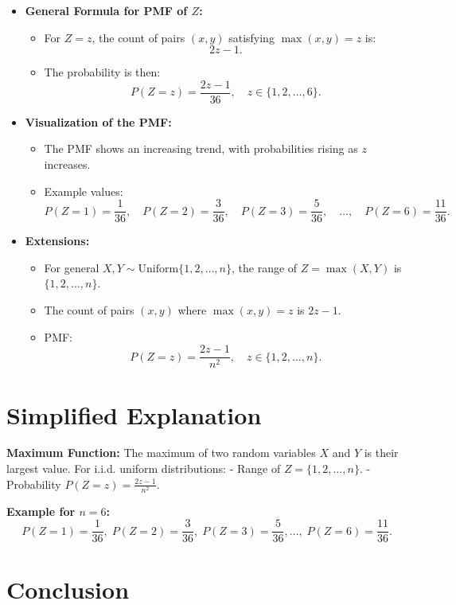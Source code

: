 \documentclass{article}
\begin{document}
\begin{itemize}
  \item \textbf{General Formula for PMF of $Z$:}
    \begin{itemize}
      \item For $Z = z$, the count of pairs $(x, y)$ satisfying $\max(x, y) = z$ is:
        \[
          2z - 1.
        \]
      \item The probability is then:
        \[
          P(Z = z) = \frac{2z - 1}{36}, \quad z \in \{1, 2, \dots, 6\}.
        \]
    \end{itemize}

  \item \textbf{Visualization of the PMF:}
    \begin{itemize}
      \item The PMF shows an increasing trend, with probabilities rising as $z$ increases.
      \item Example values:
        \[
          P(Z = 1) = \frac{1}{36}, \quad P(Z = 2) = \frac{3}{36}, \quad P(Z = 3) = \frac{5}{36}, \quad \dots, \quad P(Z = 6) = \frac{11}{36}.
        \]
    \end{itemize}

  \item \textbf{Extensions:}
    \begin{itemize}
      \item For general $X, Y \sim \text{Uniform}\{1, 2, \dots, n\}$, the range of $Z = \max(X, Y)$ is $\{1, 2, \dots, n\}$.
      \item The count of pairs $(x, y)$ where $\max(x, y) = z$ is $2z - 1$.
      \item PMF:
        \[
          P(Z = z) = \frac{2z - 1}{n^2}, \quad z \in \{1, 2, \dots, n\}.
        \]
    \end{itemize}
\end{itemize}

\section*{Simplified Explanation}

\textbf{Maximum Function:}
The maximum of two random variables $X$ and $Y$ is their largest value. For i.i.d. uniform distributions:
- Range of $Z = \{1, 2, \dots, n\}$.
- Probability $P(Z = z) = \frac{2z - 1}{n^2}$.

\textbf{Example for $n = 6$:}
\[
  P(Z = 1) = \frac{1}{36}, \; P(Z = 2) = \frac{3}{36}, \; P(Z = 3) = \frac{5}{36}, \dots, \; P(Z = 6) = \frac{11}{36}.
\]

\section*{Conclusion}
\end{document}
